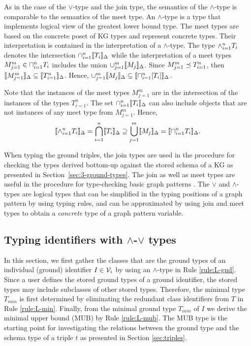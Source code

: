 \documentclass[runningheads]{llncs}
\newcommand{\llb}{\llbracket}
\newcommand{\rrb}{\rrbracket}
\newcommand{\DD}{{\Delta}}
\newcommand{\V}{{\cal V}}
\begin{document}
As in the case of the $\lor$-type and the join type, the semantics of
the $\land$-type is comparable to the semantics of the meet type. An
$\land$-type is a type that implements logical view of the greatest
lower bound type. The meet types are based on the concrete poset of KG
types and represent concrete types. Their interpretation is contained
in the interpretation of a $\land$-type. The type $\land_{i=1}^n\/T_i$
denotes the intersection $\cap_{i=1}^n\/\llb\/T_i\rrb_\DD$ while the
interpretation of a meet types $M_{j=1}^m\in\sqcap_{i=1}^n\/T_i$
includes the union $\cup_{j=1}^m\llb\/M_j\rrb_\DD$. Since
$M_{j=1}^m\preceq\/T_{i=1}^n$, then
$\llb\/M_{j=1}^m\rrb_\DD\subseteq\llb\/T_{i=1}^n\rrb_\DD$. Hence,
$\cup_{j=1}^m\llb\/M_j\rrb_\DD\subseteq\llb\sqcap_{i=1}^n[T_i]\rrb_\DD$.

Note that the instances of the meet types $M_{j=1}^m$ are in the
intersection of the instances of the types $T_{i=1}^n$. The set
$\cap_{i=1}^n\llb\/T_i\rrb_\DD$ can also include objects that are not
instances of any meet type from $M_{j=1}^m$. Hence,
$$\llb\land_{i=1}^n\/T_i\rrb_\DD=\bigcap_{i=1}^n\llb\/T_i\rrb_\DD\supseteq\bigcup_{j=1}^m\llb\/M_j\rrb_\DD=\llb\sqcap_{i=1}^n\/T_i\rrb_\DD.$$

When typing the ground triples, the join types are used in the
procedure for checking the types derived bottom-up against the stored
schema of a KG as presented in Section~\ref{sec:3-ground-types}. The
join as well as meet types are useful in the procedure for
type-checking basic graph patterns \cite{Savnik2025a}. The $\lor$ and
$\land$-types are logical types that can be simplified in the typing
positions of a graph pattern by using typing rules, and can be
approximated by using join and meet types to obtain a \emph{concrete}
type of a graph pattern variable.






\subsection{Typing identifiers with $\land$-$\lor$ types\label{sec:typing-and-or}}


In this section, we first gather the classes that are the ground types
of an individual (ground) identifier $I\in\V_i$ by using an
$\land$-type in Rule \ref{rule:L-gnd}. Since a user defines the
stored ground types of a ground identifier, the stored types may
include subclasses of other stored types. Therefore, the minimal type
$T_{min}$ is first determined by eliminating the redundant class
identifiers from $T$ in Rule \ref{rule:L-min}. Finally, from the minimal
ground type $T_{min}$ of $I$ we derive the minimal upper bound (MUB)
by Rule \ref{rule:L-mub}. The MUB type is the starting point for
investigating the relations between the ground type and the schema
type of a triple $t$ as presented in Section \ref{sec:triples}.
\end{document}
